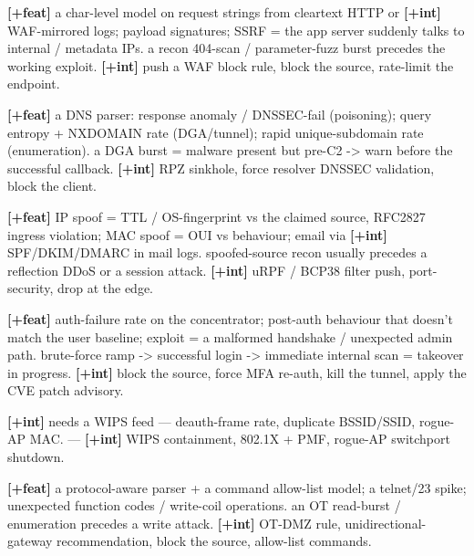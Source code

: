 \documentclass[11pt,a4paper]{article}
\begin{document}
{\textbf{[+feat]} a char-level model on request strings from cleartext HTTP or \textbf{[+int]} WAF-mirrored logs; payload signatures; SSRF = the app server suddenly talks to internal / metadata IPs.}
{a recon 404-scan / parameter-fuzz burst precedes the working exploit.}
{\textbf{[+int]} push a WAF block rule, block the source, rate-limit the endpoint.}

{\textbf{[+feat]} a DNS parser: response anomaly / DNSSEC-fail (poisoning); query entropy + NXDOMAIN rate (DGA/tunnel); rapid unique-subdomain rate (enumeration).}
{a DGA burst = malware present but pre-C2 -> warn before the successful callback.}
{\textbf{[+int]} RPZ sinkhole, force resolver DNSSEC validation, block the client.}

{\textbf{[+feat]} IP spoof = TTL / OS-fingerprint vs the claimed source, RFC2827 ingress violation; MAC spoof = OUI vs behaviour; email via \textbf{[+int]} SPF/DKIM/DMARC in mail logs.}
{spoofed-source recon usually precedes a reflection DDoS or a session attack.}
{\textbf{[+int]} uRPF / BCP38 filter push, port-security, drop at the edge.}

{\textbf{[+feat]} auth-failure rate on the concentrator; post-auth behaviour that doesn't match the user baseline; exploit = a malformed handshake / unexpected admin path.}
{brute-force ramp -> successful login -> immediate internal scan = takeover in progress.}
{\textbf{[+int]} block the source, force MFA re-auth, kill the tunnel, apply the CVE patch advisory.}

{\textbf{[+int]} needs a WIPS feed --- deauth-frame rate, duplicate BSSID/SSID, rogue-AP MAC.}
{---}
{\textbf{[+int]} WIPS containment, 802.1X + PMF, rogue-AP switchport shutdown.}

{\textbf{[+feat]} a protocol-aware parser + a command allow-list model; a telnet/23 spike; unexpected function codes / write-coil operations.}
{an OT read-burst / enumeration precedes a write attack.}
{\textbf{[+int]} OT-DMZ rule, unidirectional-gateway recommendation, block the source, allow-list commands.}
\end{document}
